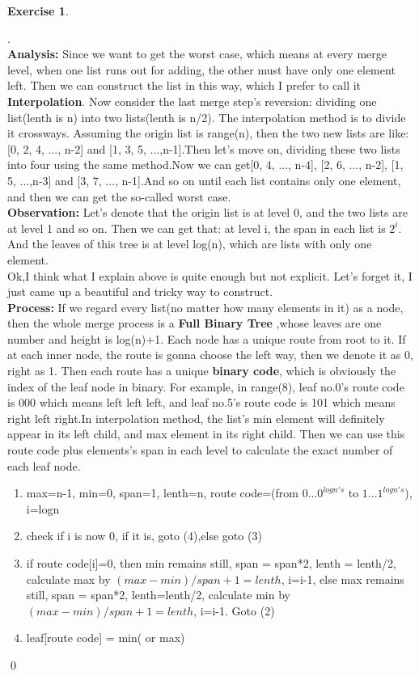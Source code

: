 \documentclass[12pt, notitlepage]{article}
\newtheorem{ex}{Exercise}
\newenvironment{sol}
  {\par\vspace{3mm}\noindent{\it Solution}.}{\qed}
\begin{document}
\begin{ex}\end{ex}
\begin{sol}\\
\textbf{Analysis:} Since we want to get the worst case, which means at every merge level, when one list runs out for adding, the other must have only one element left. Then we can construct the list in this way, which I prefer to call it \textbf{Interpolation}. Now consider the last merge step's reversion: dividing one list(lenth is n) into two lists(lenth is n/2). The interpolation method is to divide it crossways. Assuming the origin list is range(n), then the two new lists are like: [0, 2, 4, ..., n-2] and [1, 3, 5, ...,n-1].Then let's move on, dividing these two lists into four using the same method.Now we can get[0, 4, ..., n-4], [2, 6, ..., n-2], [1, 5, ...,n-3] and [3, 7, ..., n-1].And so on until each list contains only one element, and then we can get the so-called worst case.\\
\textbf{Observation:} Let's denote that the origin list is at level 0, and the two lists are at level 1 and so on. Then we can get that: at level i, the span in each list is $2^i$. And the leaves of this tree is at level log(n), which are lists with only one element.\\
Ok,I think what I explain above is quite enough but not explicit. Let's forget it, I just came up a beautiful and tricky way to construct.\\
\textbf{Process:} If we regard every list(no matter how many elements in it) as a node, then the whole merge process is a \textbf{Full Binary Tree} ,whose leaves are one number and height is log(n)+1. Each node has a unique route from root to it. If at each inner node, the route is gonna choose the left way, then we denote it as 0, right as 1. Then each route has a unique \textbf{binary code}, which is obviously the index of the leaf node in binary. For example, in range(8), leaf no.0's route code is 000 which means left left left, and leaf no.5's route code is 101 which means right left right.In interpolation method, the list's min element will definitely appear in its left child, and max element in its right child. Then we can use this route code plus elements's span in each level to calculate the exact number of each leaf node.\\
\begin{enumerate}[(1)]
\item max=n-1, min=0, span=1, lenth=n, route code=(from $0...0^{logn's}$ to $1...1^{logn's}$), i=logn
\item check if i is now 0, if it is, goto (4),else goto (3)
\item if route code[i]=0, then min remains still, span = span*2, lenth = lenth/2, calculate max by $(max-min)/span + 1 = lenth$, i=i-1, else max remains still, span = span*2, lenth=lenth/2, calculate min by $(max-min)/span + 1 = lenth$, i=i-1. Goto (2)
\item leaf[route code] = min( or max)
\end{enumerate}
\end{sol}
\end{document}
